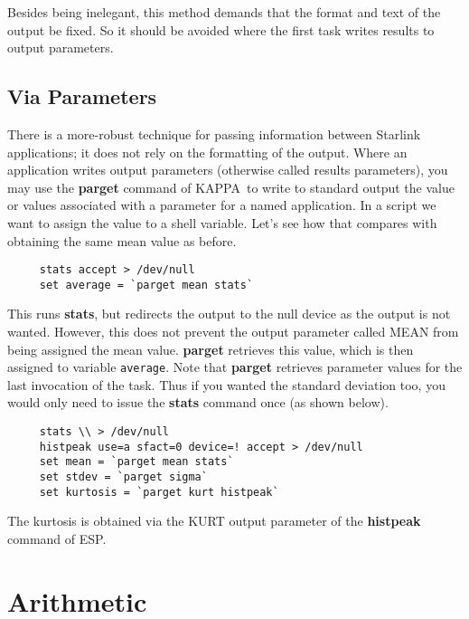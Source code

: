 \documentclass[twoside,11pt]{article}
\newcommand{\htmlref}[2]{#1}
\newcommand{\xref}[3]{#1}
\newcommand{\xlabel}[1]{}
\newcommand{\ESPref}{\xref{{\footnotesize ESP}}{sun180}{}}
\newcommand{\KAPPAref}{\xref{{\footnotesize KAPPA}}{sun95}{}}
\begin{document}
Besides being inelegant, this method demands that the format and
text of the output be fixed.  So it should be avoided where the
first task writes results to \htmlref{{\sf output
parameters}}{sc4_gl_opar}.

\subsection{\xlabel{sc4_se_info_parameter}Via Parameters
\label{sc4_se_info_parameter}}

There is a more-robust technique for passing information between
Starlink applications; it does not rely on the formatting of the
output. Where an application writes \htmlref{{\sf output
parameters}}{sc4_gl_opar} (otherwise called results parameters), you
may use the \xref{{\bf parget}}{sun95}{PARGET} command of \KAPPAref\
to write to \htmlref{{\sf standard output}}{sc4_gl_std_out} the value
or values associated with a parameter for a named application. In a
script we want to assign the value to a \htmlref{shell
variable}{sc4_se_variables}.  Let's see how that compares with
obtaining the same mean value as before.

\small
\begin{verbatim}
     stats accept > /dev/null
     set average = `parget mean stats`
\end{verbatim}
\normalsize
This runs \xref{{\bf stats}}{sun95}{STATS}, but redirects the output
to the null device as the output is not wanted.  However, this does
not prevent the output parameter called MEAN from being assigned the
mean value.  {\bf parget} retrieves this value, which is then assigned
to variable {\tt average}.  Note that {\bf parget} retrieves parameter
values for the last invocation of the task.  Thus if you wanted the
standard deviation too, you would only need to issue the {\bf stats}
command once (as shown below).

\small
\begin{verbatim}
     stats \\ > /dev/null
     histpeak use=a sfact=0 device=! accept > /dev/null
     set mean = `parget mean stats`
     set stdev = `parget sigma`
     set kurtosis = `parget kurt histpeak`
\end{verbatim}
\normalsize
The kurtosis is obtained via the KURT output parameter of the \xref{{\bf
histpeak}}{sun180}{HISTPEAK} command of \ESPref.

\newpage
\section{\xlabel{sc4_se_csharith}Arithmetic\label{sc4_se_csharith}}
\end{document}
